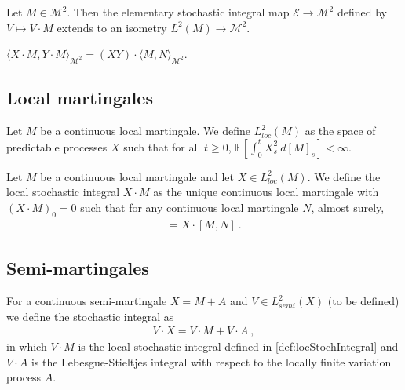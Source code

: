 \begin{definition}\label{def:itoIsometry}
Let $M \in \mathcal{M}^2$. Then the elementary stochastic integral map $\mathcal{E} \to \mathcal{M}^2$ defined by $V \mapsto V \cdot M$ extends to an isometry $L^2(M) \to \mathcal{M}^2$.
\end{definition}


\begin{lemma}\label{lem:inner_itoIsometry}
$\langle X \cdot M, Y \cdot M \rangle_{\mathcal{M}^2} = (XY) \cdot \langle M, N \rangle_{\mathcal{M}^2}$.
\end{lemma}




\subsection{Local martingales}

\begin{definition}[$L^2_{loc}(M)$]\label{def:L2locM}
Let $M$ be a continuous local martingale.
We define $L^2_{loc}(M)$ as the space of predictable processes $X$ such that for all $t \ge 0$, $\mathbb{E}\left[ \int_0^t X_s^2 \: d[M]_s \right] < \infty$.
\end{definition}


\begin{definition}\label{def:locStochIntegral}
Let $M$ be a continuous local martingale and let $X \in L^2_{loc}(M)$.
We define the local stochastic integral $X \cdot M$ as the unique continuous local martingale with $(X \cdot M)_0 = 0$ such that for any continuous local martingale $N$, almost surely,
\begin{align*}
  [X \cdot M, N] = X \cdot [M, N]
  \: .
\end{align*}
\end{definition}


\subsection{Semi-martingales}

\begin{definition}\label{def:stochIntegral}
For a continuous semi-martingale $X = M + A$ and $V \in L^2_{semi}(X)$ (to be defined) we define the stochastic integral as
\begin{align*}
  V \cdot X = V \cdot M + V \cdot A
  \: ,
\end{align*}
in which $V \cdot M$ is the local stochastic integral defined in \ref{def:locStochIntegral} and $V \cdot A$ is the Lebesgue-Stieltjes integral with respect to the locally finite variation process $A$.
\end{definition}



